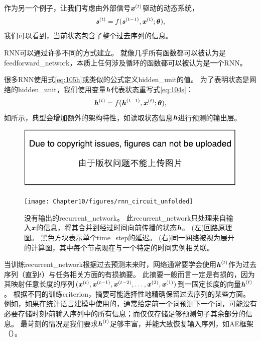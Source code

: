 
作为另一个例子，让我们考虑由外部信号$\boldsymbol{\mathit{x}}^{(t)}$驱动的动态系统，
\begin{align}
 \label{eq:104s}
 \boldsymbol{\mathit{s}}^{(t)} = f(\boldsymbol{\mathit{s}}^{(t-1)}, \boldsymbol{\mathit{x}}^{(t)} ; \boldsymbol{\theta}),
\end{align}
我们可以看到，当前状态包含了整个过去序列的信息。

\gls{RNN}可以通过许多不同的方式建立。
就像几乎所有函数都可以被认为是\gls{feedforward_network}，本质上任何涉及循环的函数都可以被认为是一个\gls{RNN}。

很多\gls{RNN}使用式\eqref{eq:105h}或类似的公式定义\gls{hidden_unit}的值。
为了表明状态是网络的\gls{hidden_unit}，我们使用变量$\boldsymbol{\mathit{h}}$代表状态重写式\eqref{eq:104s}：
\begin{align}
 \label{eq:105h}
 \boldsymbol{\mathit{h}}^{(t)} = f(\boldsymbol{\mathit{h}}^{(t-1)}, \boldsymbol{\mathit{x}}^{(t)} ; \boldsymbol{\theta}),
\end{align}
如所示，典型会增加额外的架构特性，如读取状态信息$\boldsymbol{\mathit{h}}$进行预测的输出层。
\begin{figure}[!htb]
\ifOpenSource
\centerline{\includegraphics{figure.pdf}}
\else
\centerline{\texttt{[image: Chapter10/figures/rnn\_circuit\_unfolded]}}
\fi
\caption{没有输出的\gls{recurrent_network}。
此\gls{recurrent_network}只处理来自输入$\boldsymbol{\mathit{x}}$的信息，将其合并到经过时间向前传播的状态$\boldsymbol{\mathit{h}}$。
(左)回路原理图。 黑色方块表示单个\gls{time_step}的延迟。
(右)同一网络被视为展开的计算图，其中每个节点现在与一个特定的时间实例相关联。
}
\label{fig:chap10_rnn_circuit_unfolded}
\end{figure}

当训练\gls{recurrent_network}根据过去预测未来时，网络通常要学会使用$\boldsymbol{\mathit{h}}^{(t)}$作为过去序列（直到$t$）与任务相关方面的有损摘要。
此摘要一般而言一定是有损的，因为其映射任意长度的序列$(\boldsymbol{\mathit{x}}^{(t)},\boldsymbol{\mathit{x}}^{(t-1)}, \boldsymbol{\mathit{x}}^{(t-2)},\dots,\boldsymbol{\mathit{x}}^{(2)}, \boldsymbol{\mathit{x}}^{(1)})$到一固定长度的向量$\boldsymbol{\mathit{h}}^{(t)}$。
根据不同的训练\gls{criterion}，摘要可能选择性地精确保留过去序列的某些方面。
例如，如果在统计语言建模中使用的，通常给定前一个词预测下一个词，可能没有必要存储时刻$t$前输入序列中的所有信息；而仅仅存储足够预测句子其余部分的信息。
最苛刻的情况是我们要求$\boldsymbol{\mathit{h}}^{(t)}$足够丰富，并能大致恢复输入序列，如\gls{AE}框架（）。

